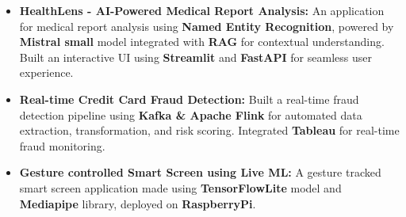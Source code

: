 \documentclass[letterpaper,6pt]{article}
\begin{document}
\begin{itemize}

     \item \textbf{\footnotesize{HealthLens - AI-Powered Medical Report Analysis:}} An application for medical report analysis using \textbf{Named Entity Recognition}, powered by \textbf{Mistral small} model integrated with \textbf{RAG} for contextual understanding. Built an interactive UI using \textbf{Streamlit} and \textbf{FastAPI} for seamless user experience.
     
     \item \textbf{\footnotesize{Real-time Credit Card Fraud Detection:}} Built a real-time fraud detection pipeline using \textbf{Kafka \& Apache Flink} for automated data extraction, transformation, and risk scoring. Integrated \textbf{Tableau} for real-time fraud monitoring.


  \item \textbf{\footnotesize{Gesture controlled Smart Screen using Live ML:}} A gesture tracked smart screen application made using \textbf{\footnotesize{TensorFlowLite}} model and \textbf{\footnotesize{Mediapipe}} library, deployed on \textbf{RaspberryPi}.


  

  




   
 
\end{itemize}
\vspace{-14pt}
\end{document}
